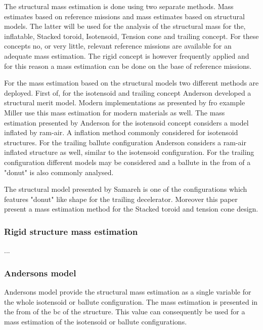 The structural mass estimation is done using two separate methods. Mass estimates based on reference missions and mass estimates based on structural models. The latter will be used for the analysis of the structural mass for the, inflatable, Stacked toroid, Isotensoid, Tension cone and trailing concept. For these concepts no, or very little, relevant reference missions are available for an adequate mass estimation. The rigid concept is however frequently applied and for this reason a mass estimation can be done on the base of reference missions.

For the mass estimation based on the structural models two different methods are deployed. First of, for the isotensoid and trailing concept Anderson \cite{Anderson1969} developed a structural merit model. Modern implementations as presented by fro example Miller \cite{Miller2014} use this mass estimation for modern materials as well. The mass estimation presented by Anderson for the isotensoid concept considers a model inflated by ram-air. A inflation method commonly considered for isotensoid structures\cite{Smith2011}. For the trailing ballute configuration Anderson considers a ram-air inflated structure as well, similar to the isotensoid configuration. For the trailing configuration different models may be considered and a ballute in the from of a "donut" is also commonly analysed. 

The structural model presented by Samareh\cite{Samareh2011} is one of the configurations which features "donut" like shape for the trailing decelerator. Moreover this paper present a mass estimation method for the Stacked toroid and tension cone design.

\subsubsection{Rigid structure mass estimation}

...

\subsubsection{Andersons model}
Andersons model provide the structural mass estimation as a single variable for the whole isotensoid or ballute configuration. The mass estimation is presented in the from of the \gls{bc} of the structure. This value can consequently be used for a mass estimation of the isotensoid or ballute configurations.

